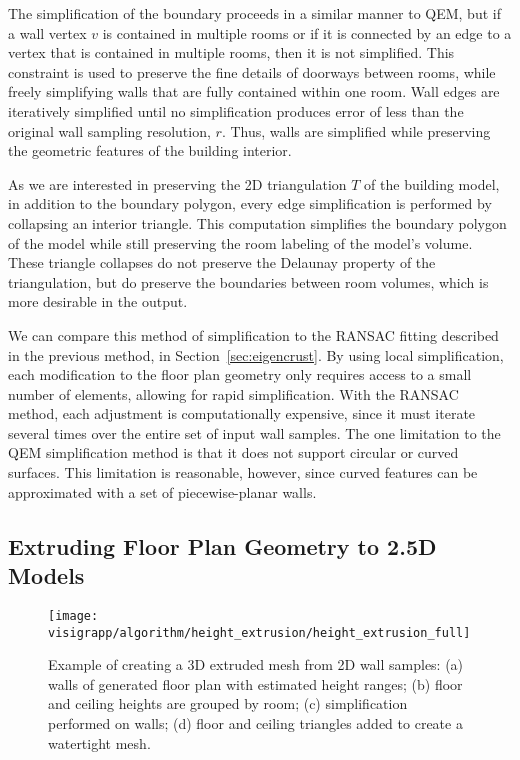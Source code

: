 \documentclass[12pt,onecolumn,oneside]{book}
\begin{document}
The simplification of the boundary proceeds in a similar manner to QEM, but if a wall vertex $v$ is contained in multiple rooms or if it is connected by an edge to a vertex that is contained in multiple rooms, then it is not simplified.  This constraint is used to preserve the fine details of doorways between rooms, while freely simplifying walls that are fully contained within one room.  Wall edges are iteratively simplified until no simplification produces error of less than the original wall sampling resolution, $r$.  Thus, walls are simplified while preserving the geometric features of the building interior.

As we are interested in preserving the 2D triangulation $T$ of the building model, in addition to the boundary polygon, every edge simplification is performed by collapsing an interior triangle.  This computation simplifies the boundary polygon of the model while still preserving the room labeling of the model's volume.  These triangle collapses do not preserve the Delaunay property of the triangulation, but do preserve the boundaries between room volumes, which is more desirable in the output.

We can compare this method of simplification to the RANSAC fitting described in the previous method, in Section~\ref{sec:eigencrust}.  By using local simplification, each modification to the floor plan geometry only requires access to a small number of elements, allowing for rapid simplification.  With the RANSAC method, each adjustment is computationally expensive, since it must iterate several times over the entire set of input wall samples.  The one limitation to the QEM simplification method is that it does not support circular or curved surfaces.  This limitation is reasonable, however, since curved features can be approximated with a set of piecewise-planar walls.

\subsection{Extruding Floor Plan Geometry to 2.5D Models}
\label{ssec:fp_extrusion}

\begin{figure}
  \centering
  \texttt{[image: visigrapp/algorithm/height\_extrusion/height\_extrusion\_full]}
  \caption[Example of creating a 3D extruded mesh from 2D wall samples.]{Example of creating a 3D extruded mesh from 2D wall samples:  (a) walls of generated floor plan with estimated height ranges; (b) floor and ceiling heights are grouped by room; (c) simplification performed on walls; (d) floor and ceiling triangles added to create a watertight mesh.}
  \label{fig:heightextrusion}
\end{figure}
\end{document}
